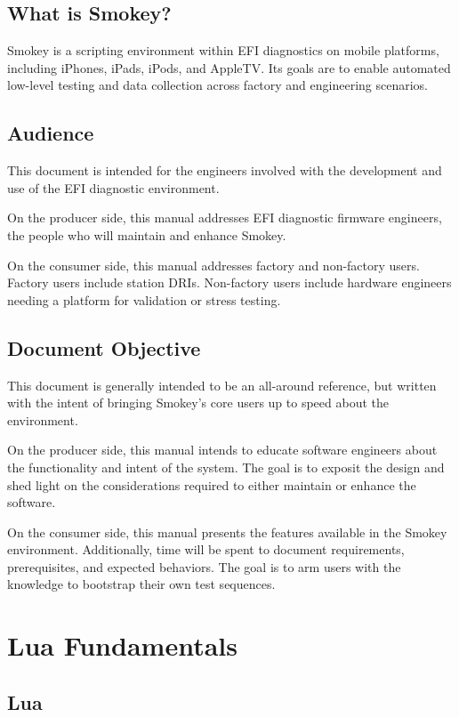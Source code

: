 \documentclass[11pt]{article}
\begin{document}
\subsection{What is Smokey?}

Smokey is a scripting environment within EFI diagnostics on mobile platforms,
including iPhones, iPads, iPods, and AppleTV.  Its goals are to enable
automated low-level testing and data collection across factory and engineering
scenarios.

\subsection{Audience}

This document is intended for the engineers involved with the development and
use of the EFI diagnostic environment.

On the producer side, this manual addresses EFI diagnostic firmware engineers,
the people who will maintain and enhance Smokey.

On the consumer side, this manual addresses factory and non-factory users.
Factory users include station DRIs.  Non-factory users include hardware
engineers needing a platform for validation or stress testing.

\subsection{Document Objective}

This document is generally intended to be an all-around reference, but written
with the intent of bringing Smokey's core users up to speed about the
environment.  

On the producer side, this manual intends to educate software engineers about
the functionality and intent of the system.  The goal is to exposit the design
and shed light on the considerations required to either maintain or enhance the
software.

On the consumer side, this manual presents the features available in the Smokey
environment.  Additionally, time will be spent to document requirements,
prerequisites, and expected behaviors.  The goal is to arm users with the
knowledge to bootstrap their own test sequences.

\section{Lua Fundamentals}

\subsection{Lua}
\end{document}
